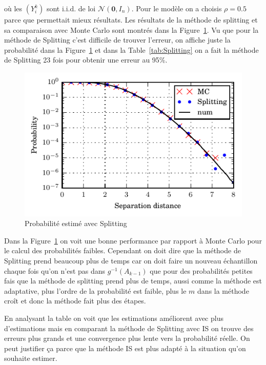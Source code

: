 \documentclass[a4paper, 12pt,twoside]{article}
\numberwithin{equation}{subsection}
\newlength{\mylength}
\begin{document}
	où les $(Y_i^k)$ sont i.i.d. de loi $\mathcal{N}(\boldsymbol 0, I_n)$. Pour le modèle on a choisis $\rho=0.5$ parce que permettait mieux résultats.
	Les résultats de la méthode de splitting et sa comparaison avec Monte Carlo sont montrés dans la Figure~\ref{fig:Splitting}. Vu que pour la méthode de Splitting c'est difficile de trouver l'erreur, on affiche juste la probabilité dans la Figure~\ref{fig:Splitting} et dans la Table~\ref{tab:Splitting} on a fait la méthode de Splitting 23 fois pour obtenir une erreur au 95\%.
	
	\begin{figure}[htbp]
		\centering
		\begin{minipage}[b]{\mylength}
			\includegraphics[width=\textwidth]{Images/Script_10_SplittingvsMC}
			\caption{Probabilité estimé avec Splitting}
			\label{fig:Splitting}
		\end{minipage}
	\end{figure}
	
	Dans la Figure~\ref{fig:Splitting} on voit une bonne performance par rapport à Monte Carlo pour le calcul des probabilités faibles. Cependant on doit dire que la méthode de Splitting prend beaucoup plus de temps car on doit faire un nouveau échantillon chaque fois qu'on n'est pas dans $g^{-1}(A_{k-1})$ que pour des probabilités petites fais que la méthode de splitting prend plus de temps, aussi comme la méthode est adaptative, plus l'ordre de la probabilité est faible, plus le $m$ dans la méthode croît et donc la méthode fait plus des étapes.
	
	En analysant la table on voit que les estimations améliorent avec plus d'estimations mais en comparant la méthode de Splitting avec IS on trouve des erreurs plus grands et une convergence plus lente vers la probabilité réelle. On peut justifier ça parce que la méthode IS est plus adapté à la situation qu'on souhaite estimer.
	
\end{document}
